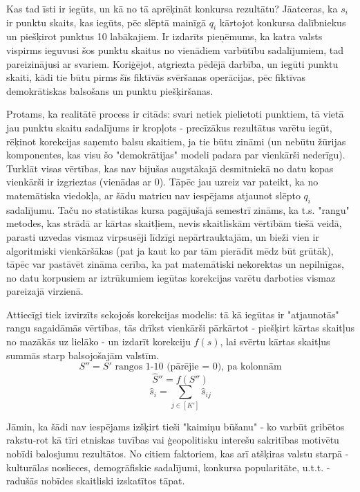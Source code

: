\documentclass[12pt, a4paper]{article}
\numberwithin{equation}{section} %
\begin{document}
Kas tad īsti ir iegūts, un kā no tā aprēķināt konkursa rezultātu? Jāatceras, ka $s_i$ ir punktu skaits, kas iegūts, pēc slēptā mainīgā $q_i$ kārtojot konkursa dalībniekus un piešķirot punktus 10 labākajiem. Ir izdarīts pieņēmums, ka katra valsts vispirms ieguvusi šos punktu skaitus no vienādiem varbūtību sadalījumiem, tad pareizinājusi ar svariem. Koriģējot, atgriezta pēdējā darbība, un iegūti punktu skaiti, kādi tie būtu pirms šīs fiktīvās svēršanas operācijas, pēc fiktīvas demokrātiskas balsošans un punktu piešķiršanas. 

Protams, ka realitātē process ir citāds: svari netiek pielietoti punktiem, tā vietā jau punktu skaitu sadalījums ir kropļots - precīzākus rezultātus varētu iegūt, rēķinot korekcijas saņemto balsu skaitiem, ja tie būtu zināmi (un nebūtu žūrijas komponentes, kas visu šo "demokrātijas" modeli padara par vienkārši nederīgu). Turklāt visas vērtības, kas nav bijušas augstākajā desmitniekā no datu kopas vienkārši ir izgrieztas (vienādas ar 0). Tāpēc jau uzreiz var pateikt, ka no matemātiska viedokļa, ar šādu matricu nav iespējams atjaunot slēpto $q_i$ sadalījumu. Taču no statistikas kursa pagājušajā semestrī zināms, ka t.s. "rangu" metodes, kas strādā ar kārtas skaitļiem, nevis skaitliskām vērtībām tiešā veidā, parasti uzvedas vismaz virpsusēji līdzīgi nepārtrauktajām, un bieži vien ir algoritmiski vienkāršākas (pat ja kaut ko par tām pierādīt mēdz būt grūtāk), tāpēc var pastāvēt zināma cerība, ka pat matemātiski nekorektas un nepilnīgas, no datu korpusiem ar iztrūkumiem iegūtas korekcijas varētu darboties vismaz pareizajā virzienā.

Attiecīgi tiek izvirzīts sekojošs korekcijas modelis: tā kā iegūtas ir "atjaunotās" rangu sagaidāmās vērtības, tās drīkst vienkārši pārkārtot - piešķirt kārtas skaitļus no mazākās uz lielāko - un izdarīt korekciju $f(s)$, lai svērtu kārtas skaitļus summās starp balsojošajām valstīm.
\begin{equation}
    S'' = S' \text{ rangos 1-10 (pārējie = 0), pa kolonnām}
\end{equation}
\begin{equation}
    \hat S'' = f(S'')
\end{equation}
\begin{equation}
    \hat s_i = \sum_{j \in [K']}\hat s_{ij}
\end{equation}


Jāmin, ka šādi nav iespējams izšķirt tieši "kaimiņu būšanu" - ko varbūt gribētos rakstu-rot kā tīri etniskas tuvības vai ģeopolitisku interešu sakritības motivētu nobīdi balosjumu rezultātos. No citiem faktoriem, kas arī atšķiras valstu starpā - kulturālas noslieces, demogrāfiskie sadalījumi, konkursa popularitāte, u.t.t. - radušās nobīdes skaitliski izskatītos tāpat. 
\end{document}

